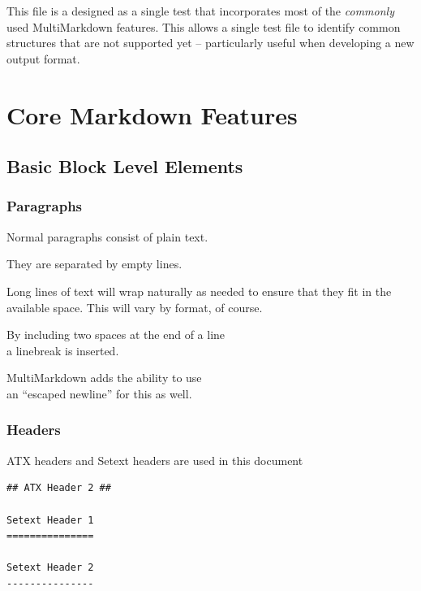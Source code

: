 \def\mytitle{Integrated Test}
\def\mysubtitle{MultiMarkdown test suite}
\def\myauthor{Fletcher T. Penney}


This file is a designed as a single test that incorporates most of
the \emph{commonly} used MultiMarkdown features. This allows a single test file to
identify common structures that are not supported yet -- particularly useful
when developing a new output format.

\part{Core Markdown Features}
\label{coremarkdownfeatures}

\chapter{Basic Block Level Elements}
\label{basicblocklevelelements}

\section{Paragraphs}
\label{paragraphs}

Normal paragraphs consist of plain text.

They are separated by empty lines.

Long lines of text will wrap naturally as needed to ensure that they fit in the available space. This will vary by format, of course.

By including two spaces at the end of a line\\
a linebreak is inserted.

MultiMarkdown adds the ability to use\\
an ``escaped newline'' for this as well.

\section{Headers}
\label{headers}

ATX headers and Setext headers are used in this document

\begin{verbatim}
## ATX Header 2 ##

Setext Header 1
===============

Setext Header 2
---------------
\end{verbatim}

